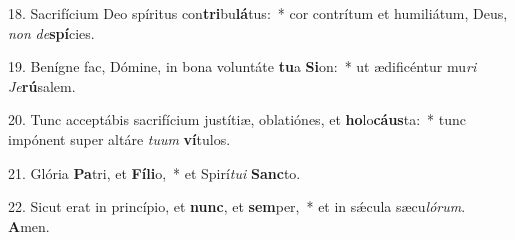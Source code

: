 18. Sacrifícium Deo spíritus con\textbf{tri}bu\textbf{lá}tus:~*  cor contrítum et humiliátum, Deus, \textit{non} \textit{de}\textbf{spí}cies.\

19. Benígne fac, Dómine, in bona voluntáte \textbf{tu}a \textbf{Si}on:~*  ut ædificéntur mu\textit{ri} \textit{Je}\textbf{rú}salem.\

20. Tunc acceptábis sacrifícium justítiæ, oblatiónes, et \textbf{ho}lo\textbf{cáus}ta:~*  tunc impónent super altáre \textit{tu}\textit{um} \textbf{ví}tulos.\

21. Glória \textbf{Pa}tri, et \textbf{Fí}\textbf{li}o,~*  et Spirí\textit{tu}\textit{i} \textbf{Sanc}to.\

22. Sicut erat in princípio, et \textbf{nunc}, et \textbf{sem}per,~*  et in sǽcula sæcu\textit{ló}\textit{rum}. \textbf{A}men.\


